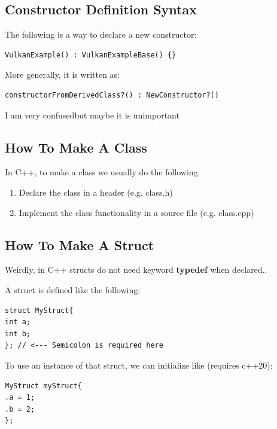 \documentclass{article}
\begin{document}
\subsection*{Constructor Definition Syntax}
\par The following is a way to declare a new constructor:

\begin{verbatim}
VulkanExample() : VulkanExampleBase() {}
\end{verbatim}

\par More generally, it is written as:
\begin{verbatim}
constructorFromDerivedClass?() : NewConstructor?()
\end{verbatim}

\par I am very confused\textemdash but maybe it is unimportant

\subsection*{How To Make A Class}
\par In C++, to make a class we usually do the following:
\begin{enumerate}
  \item Declare the class in a header (e.g. class.h)
  \item Implement the class functionality in a source file (e.g. class.cpp)
\end{enumerate}

\subsection*{How To Make A Struct}
\par Weirdly, in C++ structs do not need keyword \textbf{typedef}
when declared..

\par A struct is defined like the following:
\begin{verbatim}
struct MyStruct{
int a;
int b;
}; // <--- Semicolon is required here
\end{verbatim}

\par To use an instance of that struct, we can initialize like (requires c++20):
\begin{verbatim}
MyStruct myStruct{
.a = 1;
.b = 2;
};
\end{verbatim}
\end{document}
